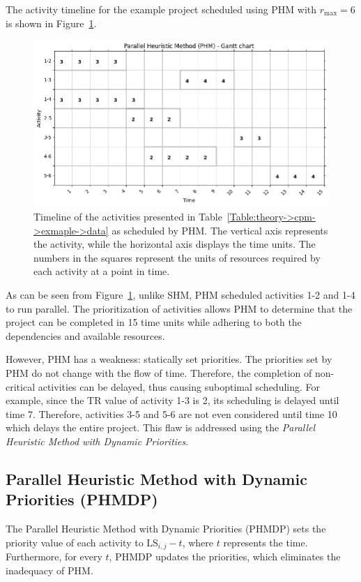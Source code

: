 The activity timeline for the example project scheduled using PHM with $r_\mathrm{max} = 6$ is shown in Figure~\ref{Figure:theory->phm->example->timeline}.

\begin{figure}[ht!]
	\centering
	\includegraphics[width=\linewidth]{images/theory/phm_example_project.png}
	\caption{Timeline of the activities presented in Table~\ref{Table:theory->cpm->exmaple->data} as scheduled by PHM.
		The vertical axis represents the activity, while the horizontal axis displays the time units.
		The numbers in the squares represent the units of resources required by each activity at a point in time.
	}
	\label{Figure:theory->phm->example->timeline}
\end{figure}

As can be seen from Figure~\ref{Figure:theory->phm->example->timeline}, unlike SHM, PHM scheduled activities 1-2 and 1-4 to run parallel.
The prioritization of activities allows PHM to determine that the project can be completed in 15 time units while adhering to both the dependencies and available resources.

However, PHM has a weakness: statically set priorities.
The priorities set by PHM do not change with the flow of time.
Therefore, the completion of non-critical activities can be delayed, thus causing suboptimal scheduling.
For example, since the TR value of activity 1-3 is 2, its scheduling is delayed until time 7.
Therefore, activities 3-5 and 5-6 are not even considered until time 10 which delays the entire project.
This flaw is addressed using the \textit{Parallel Heuristic Method with Dynamic Priorities}.



\subsection{Parallel Heuristic Method with Dynamic Priorities (PHMDP)}
The Parallel Heuristic Method with Dynamic Priorities (PHMDP) sets the priority value of each activity to $\mathrm{LS}_{i, j} - t$, where $t$ represents the time.
Furthermore, for every $t$, PHMDP updates the priorities, which eliminates the inadequacy of PHM.


